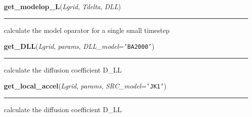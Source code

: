     \label{spacepy:radbelt:get_modelop_L}

    \vspace{0.5ex}

\hspace{.8\funcindent}\begin{boxedminipage}{\funcwidth}

    \raggedright \textbf{get\_modelop\_L}(\textit{Lgrid}, \textit{Tdelta}, \textit{DLL})

    \vspace{-1.5ex}

    \rule{\textwidth}{0.5\fboxrule}
\setlength{\parskip}{2ex}
    calculate the model oparator for a single small timestep

\setlength{\parskip}{1ex}
    \end{boxedminipage}

    \label{spacepy:radbelt:get_DLL}

    \vspace{0.5ex}

\hspace{.8\funcindent}\begin{boxedminipage}{\funcwidth}

    \raggedright \textbf{get\_DLL}(\textit{Lgrid}, \textit{params}, \textit{DLL\_model}={\tt \texttt{'}\texttt{BA2000}\texttt{'}})

    \vspace{-1.5ex}

    \rule{\textwidth}{0.5\fboxrule}
\setlength{\parskip}{2ex}
    calculate the diffusion coefficient D\_LL

\setlength{\parskip}{1ex}
    \end{boxedminipage}

    \label{spacepy:radbelt:get_local_accel}

    \vspace{0.5ex}

\hspace{.8\funcindent}\begin{boxedminipage}{\funcwidth}

    \raggedright \textbf{get\_local\_accel}(\textit{Lgrid}, \textit{params}, \textit{SRC\_model}={\tt \texttt{'}\texttt{JK1}\texttt{'}})

    \vspace{-1.5ex}

    \rule{\textwidth}{0.5\fboxrule}
\setlength{\parskip}{2ex}
    calculate the diffusion coefficient D\_LL

\setlength{\parskip}{1ex}
    \end{boxedminipage}


